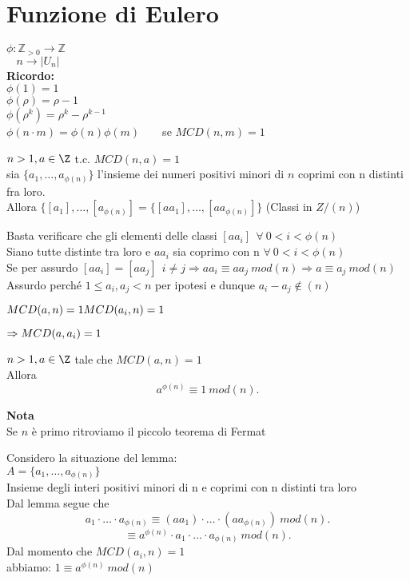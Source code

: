 \documentclass[12px]{article}
\begin{document}
	\section{Funzione di Eulero}
	$\phi: \mathbb Z_{>0} \rightarrow \mathbb Z$\\
	$\text{} \ \ \ \ n \rightarrow |U_n|$\\
	\textbf{Ricordo:}\\
	$\phi(1) = 1$\\
	 $\phi(\rho) = \rho -1$\\
	 $\phi(\rho^k) = \rho^k - \rho ^{k-1}$\\
	 $\phi(n\cdot m) = \phi(n)\phi(m)$\ \ \ \ se  $MCD(n,m) = 1$\\
	  \begin{lemm}
	 	$n>1, a\in\Z$ t.c.  $MCD(n,a) = 1$\\
		sia  $\{a_1,\ldots,a_{\phi(n)}\}$ l'insieme dei numeri positivi minori di $n$ coprimi con n distinti fra loro.\\
		Allora $\{[a_1],\ldots,[a_{\phi(n)}] = \{[aa_1],\ldots, [aa_{\phi(n)}]\}$ (Classi in $Z/(n)$)
	 \end{lemm}
	 \begin{dimo}
		 Basta verificare che gli elementi delle classi $[aa_i] \ \ \forall \ 0<i<\phi(n)$\\
		 Siano tutte distinte tra loro e  $aa_i$ sia coprimo con n  $\forall \ 0<i<\phi(n)$ \\
		 Se per assurdo $[aa_i] = [aa_j] \ \ i\neq j \Rightarrow aa_i\equiv aa_j\  mod(n) \Rightarrow a\equiv a_j \ mod(n)$ Assurdo perché $1\leq a_i, a_j< n$ per ipotesi e dunque  $a_i-a_j\not\in (n)$\\
		 \begin{cases}
		  $MCD(a,n) = 1 \\ MCD(a_i,n) = 1$
		 \end{cases} $\Rightarrow MCD(a,a_i) = 1\\$
	 \end{dimo}
	 \begin{teo}[Eulero 1760]
	 	$n>1 ,a\in\Z$ tale che $MCD(a,n) = 1$\\
		Allora
		 \[
			 a^{\phi(n)}\equiv 1\  mod(n)
		.\] 
	 \end{teo}
	 \textbf{Nota}\\
	 Se $n$ è primo ritroviamo il piccolo teorema di Fermat
	 \begin{dimo}
	 	Considero la situazione del lemma:\\
		$A = \{a_1,\ldots,a_{\phi(n)}\}$\\
			Insieme degli interi positivi minori di n e coprimi con n distinti tra loro\\
			Dal lemma segue che
			\[
				a_1\cdot\ldots\cdot a_{\phi(n)}\equiv (aa_1)\cdot\ldots\cdot (aa_{\phi(n)}) \ mod(n)
			.\] 
			\[
				\equiv a^{\phi(n)}\cdot a_1\cdot\ldots\cdot a_{\phi(n)} \ mod(n)
			.\] 
			Dal momento che $MCD(a_i,n) = 1$\\
			abbiamo:  $1\equiv a^{\phi(n)}\ mod(n)$
	 \end{dimo}
\end{document}
